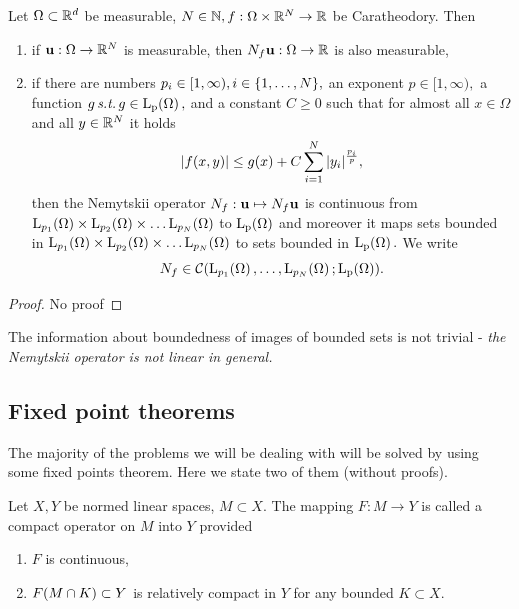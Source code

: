 \documentclass{article}
\begin{document}
\begin{theorem}
  Let $\Omega \subset {\mathbb R}^{d}$ be measurable, $N \in {\mathbb N}, f: \Omega \times {\mathbb R}^{N} \to {\mathbb R}$ be Caratheodory. Then

  \begin{enumerate}
	  \item if $\vb{u}: \Omega \to {\mathbb R}^{N}$ is measurable, then $N_f \vb{u}: \Omega \to {\mathbb R}$ is also measurable,
	  \item if there are numbers $p_i \in [1, \infty), i \in \qty{1, \dots, N},$ an exponent $p \in [1, \infty),$ a function $g \, \text{\textit{s.t.}} \, g \in \LpSet{\Omega},$ and a constant $C\geq 0$ such that for almost all $x \in \Omega$ and all $y \in {\mathbb R}^{N}$ it holds
		  \[
			  \abs{f(x,y)}\leq g(x) + C \sum_{i=1}^N\abs{y_i}^{\frac{p_i}{p}},
		  \]
		  then the Nemytskii operator $N_f: \vb{u} \mapsto N_f\vb{u}$ is continuous from $\LpSet[p_1]{\Omega} \times \LpSet[p_2]{\Omega} \times \dots \LpSet[p_N]{\Omega}$ to $\LpSet{\Omega}$ and moreover it maps sets bounded in $\LpSet[p_1]{\Omega} \times \LpSet[p_2]{\Omega} \times \dots \LpSet[p_N]{\Omega}$ to sets bounded in $\LpSet{\Omega}.$ We write
		  \[
			  N_f \in \mathcal{C}\qty(\LpSet[p_1]{\Omega}, \dots, \LpSet[p_N]{\Omega}; \LpSet{\Omega}).
		  \]
  \end{enumerate}
\end{theorem}

\begin{proof}
	No proof
\end{proof}

\begin{remark}
	The information about boundedness of images of bounded sets is not trivial - \textit{the Nemytskii operator is not linear in general.}
\end{remark}

\subsection{Fixed point theorems}
\label{sec:fixed_points}
The majority of the problems we will be dealing with will be solved by using some fixed points theorem. Here we state two of them (without proofs).

\begin{definition}
	Let $X,Y$ be normed linear spaces, $M \subset X.$ The mapping $F:M \to Y$ is called a compact operator on $M$ into $Y$ provided
	\begin{enumerate}
		\item $F$ is continuous,
		\item $F\qty(M \cap K) \subset Y$ is relatively compact in $Y$ for any bounded $K \subset X.$
	\end{enumerate}
\end{definition}
\end{document}

